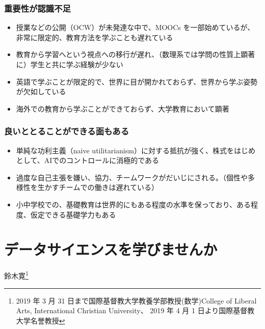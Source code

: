 \documentclass[
]{book}
\providecommand{\tightlist}{%
  \setlength{\itemsep}{0pt}\setlength{\parskip}{0pt}}
\theoremstyle{definition}
\theoremstyle{definition}
\theoremstyle{definition}
\theoremstyle{definition}
\theoremstyle{remark}
\begin{document}
\hypertarget{ux91cdux8981ux6027ux304cux8a8dux8b58ux4e0dux8db3-1}{%
\subsection{重要性が認識不足}\label{ux91cdux8981ux6027ux304cux8a8dux8b58ux4e0dux8db3-1}}

\begin{itemize}
\tightlist
\item
  授業などの公開（OCW）が未発達な中で、MOOCs を一部始めているが、非常に限定的、教育方法を学ぶことも遅れている
\item
  教育から学習へという視点への移行が遅れ、（数理系では学問の性質上顕著に）学生と共に学ぶ経験が少ない
\item
  英語で学ぶことが限定的で、世界に目が開かれておらず、世界から学ぶ姿勢が欠如している
\item
  海外での教育から学ぶことができておらず、大学教育において顕著
\end{itemize}

\hypertarget{ux826fux3044ux3068ux3068ux308bux3053ux3068ux304cux3067ux304dux308bux9762ux3082ux3042ux308b-1}{%
\subsection{良いととることができる面もある}\label{ux826fux3044ux3068ux3068ux308bux3053ux3068ux304cux3067ux304dux308bux9762ux3082ux3042ux308b-1}}

\begin{itemize}
\tightlist
\item
  単純な功利主義（naive utilitarianism）に対する抵抗が強く、株式をはじめとして、AIでのコントロールに消極的である
\item
  過度な自己主張を嫌い、協力、チームワークがだいじにされる。（個性や多様性を生かすチームでの働きは遅れている）
\item
  小中学校での、基礎教育は世界的にもある程度の水準を保っており、ある程度、仮定できる基礎学力もある
\end{itemize}

\hypertarget{susemi202006}{%
\chapter{データサイエンスを学びませんか}\label{susemi202006}}

鈴木寛\footnote{2019 年 3 月 31 日まで国際基督教大学教養学部教授(数学)College of Liberal Arts, International Christian University、 2019 年 4 月 1 日より国際基督教大学名誉教授}
\end{document}
